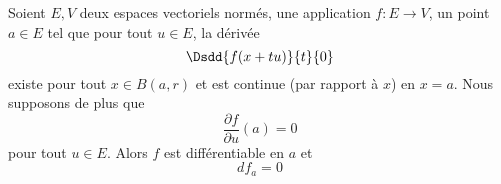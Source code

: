 \begin{theorem} \label{ThoOYwdeVt}
	Soient \( E,V\) deux espaces vectoriels normés, une application \( f\colon E\to V\), un point \( a\in E\) tel que pour tout \( u\in E\), la dérivée
	\begin{equation}
		\Dsdd{ f(x+tu) }{t}{0}
	\end{equation}
	existe pour tout \( x\in B(a,r)\) et est continue (par rapport à \( x\)) en \( x=a\). Nous supposons de plus que
	\begin{equation}
		\frac{ \partial f }{ \partial u }(a)=0
	\end{equation}
	pour tout \( u\in E\). Alors \( f\) est différentiable en \( a\) et
	\begin{equation}
		df_a=0
	\end{equation}
\end{theorem}

